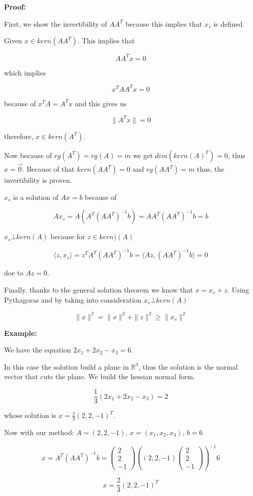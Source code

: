 \textbf{Proof:}

First, we show the invertibility of \(AA^T\) because this implies that \(x_s\) is defined.
\vspace{\baselineskip}

Given \(x \in kern(AA^T)\). This implies that 

\[AA^T x = 0\] 

which implies 

\[x^T AA^T x = 0\] 

because of \(x^T A = A^T x\) and this gives us 

\[
\|A^T x\| = 0
\] 

therefore, \(x \in kern(A^T)\).
\vspace{\baselineskip}

Now because of \(rg(A^T) = rg(A) = m\) we get \(dim(kern(A)^T) = 0\), thus \(x = \vec{0}\). 
Because of that \(kern(A A^T) = 0\) and \(rg(AA^T) = m\) thus, the invertibility is proven.
\vspace{\baselineskip}

\(x_s\) is a solution of \(Ax = b\) because of 

\[
Ax_s = A(A^T {(A A^T)}^{-1} b) = AA^T {(A A^T)}^{-1} b = b
\]


\(x_s \bot kern(A)\) because for \(z \in kern)(A)\)

\[
\langle z, x_s\rangle = z^T A^T {(A A^T)}^{-1} b = \langle Az, {(A A^T)}^{-1} b \rangle = 0
\]

doe to \(Az = 0\).
\vspace{\baselineskip}

Finally, thanks to the general solution theorem we know that \(x = x_s + z\). Using Pythagoras and by 
taking into consideration \(x_s \bot kern(A)\)

\[
\| x\|^2 = \|x\|^2 + \|z\|^2 \ge \|x_s\|^2
\]


\textbf{Example:}
\vspace{\baselineskip}

We have the equation \(2x_1 + 2x_2 - x_3 = 6\).
\vspace{\baselineskip}

In this case the solution build a plane in \(\mathbb{R}^3\), thus the solution is the normal vector that 
cuts the plane. We build the hessian normal form.

\[
\frac{1}{3} (2x_1 + 2x_2 - x_3) = 2
\]

whose solution is \(x = \frac{2}{3}(2, 2, -1)^T\).
\vspace{\baselineskip}

Now with our method: \(A = (2, 2, -1)\), \(x = (x_1, x_2, x_3)\), \(b = 6\)

\[
x = A^T {(AA^T)}^{-1} b =
\begin{pmatrix}
2\\
2\\
-1
\end{pmatrix}
{\left(
	(2,2,-1)
\begin{pmatrix}
2\\
2\\
-1		
\end{pmatrix}
\right)}^{-1}
6
\]

\[
x = \frac{2}{3}(2, 2, -1)^T
\]

